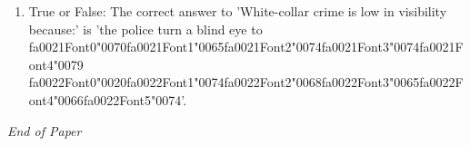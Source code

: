 \documentclass[12pt]{article}
\begin{document}
\begin{enumerate}[label=\arabic*.]
\item True or False: The correct answer to 'White-collar crime is low in visibility because:' is 'the police turn a blind eye to {\csname fa0021Font0\endcsname\char"0070}{\csname fa0021Font1\endcsname\char"0065}{\csname fa0021Font2\endcsname\char"0074}{\csname fa0021Font3\endcsname\char"0074}{\csname fa0021Font4\endcsname\char"0079} {\csname fa0022Font0\endcsname\char"0020}{\csname fa0022Font1\endcsname\char"0074}{\csname fa0022Font2\endcsname\char"0068}{\csname fa0022Font3\endcsname\char"0065}{\csname fa0022Font4\endcsname\char"0066}{\csname fa0022Font5\endcsname\char"0074}'.
\end{enumerate}

\vfill
\noindent\textit{End of Paper}
\end{document}
